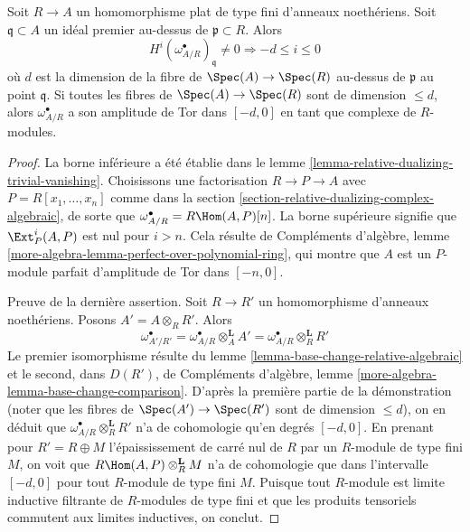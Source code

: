 \begin{lemma}
\label{lemma-relative-dualizing-flat-vanishing}
Soit $R \to A$ un homomorphisme plat de type fini d'anneaux noethériens.
Soit $\mathfrak q \subset A$ un idéal premier au-dessus de $\mathfrak p \subset R$. Alors
$$
H^i(\omega_{A/R}^\bullet)_\mathfrak q \not = 0
\Rightarrow - d \leq i \leq 0
$$
où $d$ est la dimension de la fibre de $\Spec(A) \to \Spec(R)$ au-dessus de $\mathfrak p$ au point $\mathfrak q$.
Si toutes les fibres de $\Spec(A) \to \Spec(R)$ sont de dimension $\leq d$,
alors $\omega_{A/R}^\bullet$ a son amplitude de Tor dans $[-d, 0]$
en tant que complexe de $R$-modules.
\end{lemma}

\begin{proof}
La borne inférieure a été établie dans le lemme \ref{lemma-relative-dualizing-trivial-vanishing}.
Choisissons une factorisation $R \to P \to A$ avec $P = R[x_1, \ldots, x_n]$ comme dans la section \ref{section-relative-dualizing-complex-algebraic},
de sorte que $\omega_{A/R}^\bullet = R\Hom(A, P)[n]$.
La borne supérieure signifie que $\Ext^i_P(A, P)$ est nul pour $i > n$.
Cela résulte de Compléments d'algèbre, lemme \ref{more-algebra-lemma-perfect-over-polynomial-ring},
qui montre que $A$ est un $P$-module parfait
d'amplitude de Tor dans $[-n, 0]$.

\medskip\noindent
Preuve de la dernière assertion. Soit $R \to R'$ un homomorphisme d'anneaux noethériens.
Posons $A' = A \otimes_R R'$. Alors
$$
\omega_{A'/R'}^\bullet =
\omega_{A/R}^\bullet \otimes_A^\mathbf{L} A' =
\omega_{A/R}^\bullet \otimes_R^\mathbf{L} R'
$$
Le premier isomorphisme résulte du lemme \ref{lemma-base-change-relative-algebraic} et le second,
dans $D(R')$, de Compléments d'algèbre, lemme \ref{more-algebra-lemma-base-change-comparison}.
D'après la première partie de la démonstration
(noter que les fibres de $\Spec(A') \to \Spec(R')$ sont de dimension $\leq d$),
on en déduit que $\omega_{A/R}^\bullet \otimes_R^\mathbf{L} R'$ n'a de cohomologie qu'en degrés $[-d, 0]$.
En prenant pour $R' = R \oplus M$ l'épaississement de carré nul de $R$
par un $R$-module de type fini $M$, on voit que $R\Hom(A, P) \otimes_R^\mathbf{L} M$
n'a de cohomologie que dans l'intervalle $[-d, 0]$
pour tout $R$-module de type fini $M$.
Puisque tout $R$-module est limite inductive filtrante de $R$-modules
de type fini et que les produits tensoriels commutent aux limites inductives,
on conclut.
\end{proof}

